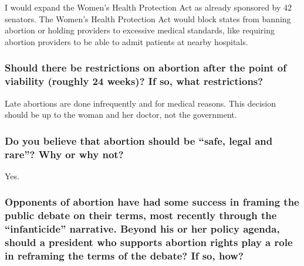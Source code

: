 I would expand the Women's Health Protection Act as already sponsored by
42 senators. The Women's Health Protection Act would block states from
banning abortion or holding providers to excessive medical standards,
like requiring abortion providers to be able to admit patients at nearby
hospitals.

\hypertarget{should-there-be-restrictions-on-abortion-after-the-point-of-viability-roughly-24-weeks-if-so-what-restrictions-8}{%
\subsubsection{Should there be restrictions on abortion after the point
of viability (roughly 24 weeks)? If so, what
restrictions?}\label{should-there-be-restrictions-on-abortion-after-the-point-of-viability-roughly-24-weeks-if-so-what-restrictions-8}}

Late abortions are done infrequently and for medical reasons. This
decision should be up to the woman and her doctor, not the government.

\hypertarget{do-you-believe-that-abortion-should-be-safe-legal-and-rare-why-or-why-not-8}{%
\subsubsection{Do you believe that abortion should be ``safe, legal and
rare''? Why or why
not?}\label{do-you-believe-that-abortion-should-be-safe-legal-and-rare-why-or-why-not-8}}

Yes.

\hypertarget{opponents-of-abortion-have-had-some-success-in-framing-the-public-debate-on-their-terms-most-recently-through-the-infanticide-narrative-beyond-his-or-her-policy-agenda-should-a-president-who-supports-abortion-rights-play-a-role-in-reframing-the-terms-of-the-debate-if-so-how-8}{%
\subsubsection{Opponents of abortion have had some success in framing
the public debate on their terms, most recently through the
``infanticide'' narrative. Beyond his or her policy agenda, should a
president who supports abortion rights play a role in reframing the
terms of the debate? If so,
how?}\label{opponents-of-abortion-have-had-some-success-in-framing-the-public-debate-on-their-terms-most-recently-through-the-infanticide-narrative-beyond-his-or-her-policy-agenda-should-a-president-who-supports-abortion-rights-play-a-role-in-reframing-the-terms-of-the-debate-if-so-how-8}}

